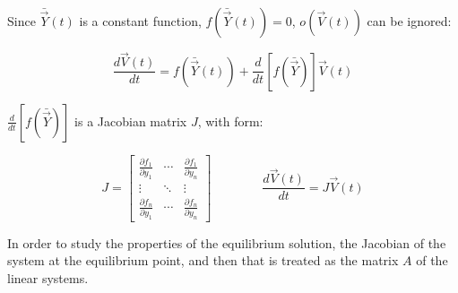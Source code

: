   Since $\bar{\vec{Y}}(t)$ is a constant function, $f(\bar{\vec{Y}}(t)) = 0$, $o(\vec{V}(t))$ can be ignored:

  $$\frac{d\vec{V}(t)}{dt} = f(\bar{\vec{Y}}(t)) + \frac{d}{dt}\left[f(\bar{\vec{Y}})\right]\vec{V}(t)$$

  $\frac{d}{dt}\left[f(\bar{\vec{Y}})\right]$ is a Jacobian matrix $J$, with form:

  $$J = \begin{bmatrix} \frac{\partial f_1}{\partial y_1} & \cdots & \frac{\partial f_1}{\partial y_n}\\\vdots & \ddots & \vdots\\\frac{\partial f_n}{\partial y_1} & \cdots & \frac{\partial f_n}{\partial y_n}\end{bmatrix}\qquad\qquad \frac{d\vec{V}(t)}{dt} = J\vec{V}(t)$$

  In order to study the properties of the equilibrium solution, the Jacobian of the system at the equilibrium point, and then that is treated as the matrix $A$ of the linear systems.




















